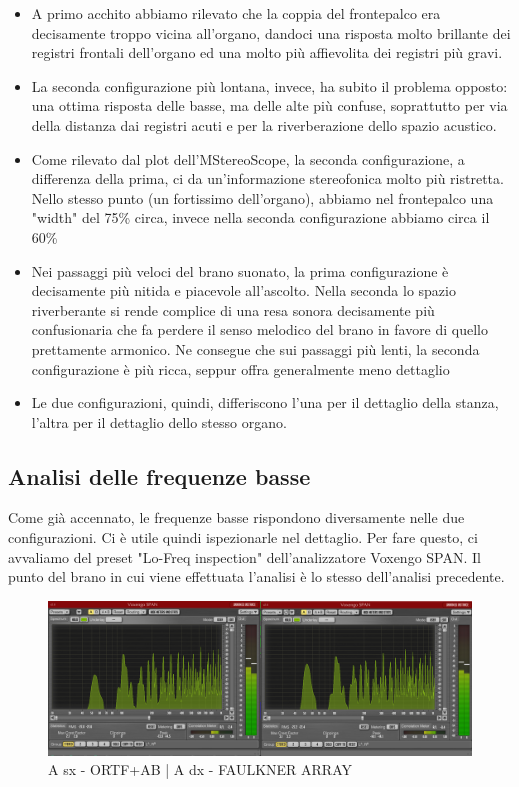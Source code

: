 \documentclass{article}
\begin{document}
    \begin{itemize}
        \item A primo acchito abbiamo rilevato che la coppia del frontepalco era decisamente troppo vicina all'organo, dandoci una risposta molto brillante dei registri frontali dell'organo ed una molto più affievolita dei registri più gravi.
        \item La seconda configurazione più lontana, invece, ha subito il problema opposto: una ottima risposta delle basse, ma delle alte più confuse, soprattutto per via della distanza dai registri acuti e per la riverberazione dello spazio acustico.
        \item Come rilevato dal plot dell'MStereoScope, la seconda configurazione, a differenza della prima, ci da un'informazione stereofonica molto più ristretta. Nello stesso punto (un fortissimo dell'organo), abbiamo nel frontepalco una "width" del 75\% circa, invece nella seconda configurazione abbiamo circa il 60\%
        \item Nei passaggi più veloci del brano suonato, la prima configurazione è decisamente più nitida e piacevole all'ascolto. Nella seconda lo spazio riverberante si rende complice di una resa sonora decisamente più confusionaria che fa perdere il senso melodico del brano in favore di quello prettamente armonico. Ne consegue che sui passaggi più lenti, la seconda configurazione è più ricca, seppur offra generalmente meno dettaglio
        \item Le due configurazioni, quindi, differiscono l'una per il dettaglio della stanza, l'altra per il dettaglio dello stesso organo.
    \end{itemize}

    
\subsection{Analisi delle frequenze basse}
    Come già accennato, le frequenze basse rispondono diversamente nelle due configurazioni. Ci è utile quindi ispezionarle nel dettaglio. Per fare questo, ci avvaliamo del preset "Lo-Freq inspection" dell'analizzatore Voxengo SPAN. Il punto del brano in cui viene effettuata l'analisi è lo stesso dell'analisi precedente.
    
    \begin{figure}[H]
        \centering
        \includegraphics[width=1\textwidth]{images/2PLOT-SPAN.png}
         \caption{\label{fig11}A sx - ORTF+AB | A dx - FAULKNER ARRAY}
    \end{figure}
    
\end{document}
